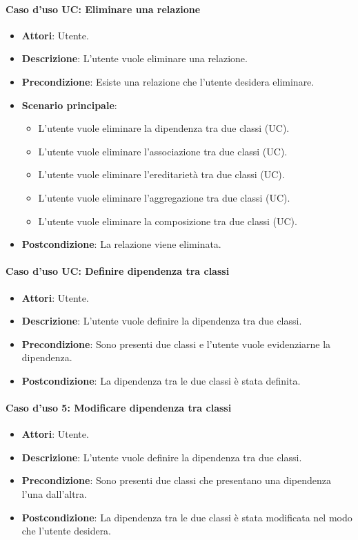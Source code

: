 \paragraph{Caso d'uso UC: Eliminare una relazione}
\begin{itemize}
	\item\textbf{Attori}: Utente.
	\item\textbf{Descrizione}: L'utente vuole eliminare una relazione.
	\item\textbf{Precondizione}: Esiste una relazione che l'utente desidera eliminare.
	\item\textbf{Scenario principale}: 
		\begin{itemize}
			\item L'utente vuole eliminare la dipendenza tra due classi (UC).
			\item L'utente vuole eliminare l'associazione tra due classi (UC).
			\item L'utente vuole eliminare l'ereditarietà tra due classi (UC).
			\item L'utente vuole eliminare l'aggregazione tra due classi (UC).
			\item L'utente vuole eliminare la composizione tra due classi (UC).
		\end{itemize}
	\item\textbf{Postcondizione}: La relazione viene eliminata.
\end{itemize}

\paragraph{Caso d'uso UC: Definire dipendenza tra classi}
\begin{itemize}
	\item\textbf{Attori}: Utente.
	\item\textbf{Descrizione}: L'utente vuole definire la dipendenza tra due classi.
	\item\textbf{Precondizione}: Sono presenti due classi e l'utente vuole evidenziarne la dipendenza.
	\item\textbf{Postcondizione}: La dipendenza tra le due classi è stata definita.
\end{itemize}

\paragraph{Caso d'uso 5: Modificare dipendenza tra classi}
\begin{itemize}
	\item\textbf{Attori}: Utente.
	\item\textbf{Descrizione}: L'utente vuole definire la dipendenza tra due classi.
	\item\textbf{Precondizione}: Sono presenti due classi che presentano una dipendenza l'una dall'altra.
	\item\textbf{Postcondizione}: La dipendenza tra le due classi è stata modificata nel modo che l'utente desidera.
\end{itemize}

